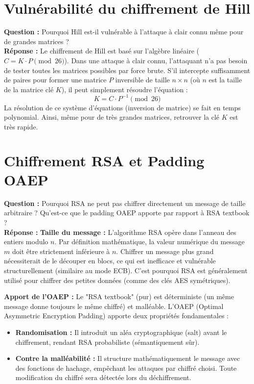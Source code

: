 \documentclass[12pt,a4paper]{report}
\begin{document}
\section{Vulnérabilité du chiffrement de Hill}
\textbf{Question :} Pourquoi Hill est-il vulnérable à l'attaque à clair connu même pour de grandes matrices ?\\
\textbf{Réponse :}
Le chiffrement de Hill est basé sur l'algèbre linéaire ($C = K \cdot P \pmod{26}$).
Dans une attaque à clair connu, l'attaquant n'a pas besoin de tester toutes les matrices possibles par force brute. S'il intercepte suffisamment de paires pour former une matrice $P$ inversible de taille $n \times n$ (où $n$ est la taille de la matrice clé $K$), il peut simplement résoudre l'équation :
$$K = C \cdot P^{-1} \pmod{26}$$
La résolution de ce système d'équations (inversion de matrice) se fait en temps polynomial. Ainsi, même pour de très grandes matrices, retrouver la clé $K$ est très rapide.

\section{Chiffrement RSA et Padding OAEP}
\textbf{Question :} Pourquoi RSA ne peut pas chiffrer directement un message de taille arbitraire ? Qu'est-ce que le padding OAEP apporte par rapport à RSA textbook ?\\
\textbf{Réponse :}
\textbf{Taille du message :} L'algorithme RSA opère dans l'anneau des entiers modulo $n$. Par définition mathématique, la valeur numérique du message $m$ doit être strictement inférieure à $n$. Chiffrer un message plus grand nécessiterait de le découper en blocs, ce qui est inefficace et vulnérable structurellement (similaire au mode ECB). C'est pourquoi RSA est généralement utilisé pour chiffrer des petites données (comme des clés AES symétriques).

\textbf{Apport de l'OAEP :}
Le "RSA textbook" (pur) est déterministe (un même message donne toujours le même chiffré) et malléable.
L'OAEP (Optimal Asymmetric Encryption Padding) apporte deux propriétés fondamentales :
\begin{itemize}
    \item \textbf{Randomisation :} Il introduit un aléa cryptographique (salt) avant le chiffrement, rendant RSA probabiliste (sémantiquement sûr).
    \item \textbf{Contre la malléabilité :} Il structure mathématiquement le message avec des fonctions de hachage, empêchant les attaques par chiffré choisi. Toute modification du chiffré sera détectée lors du déchiffrement.
\end{itemize}
\end{document}
